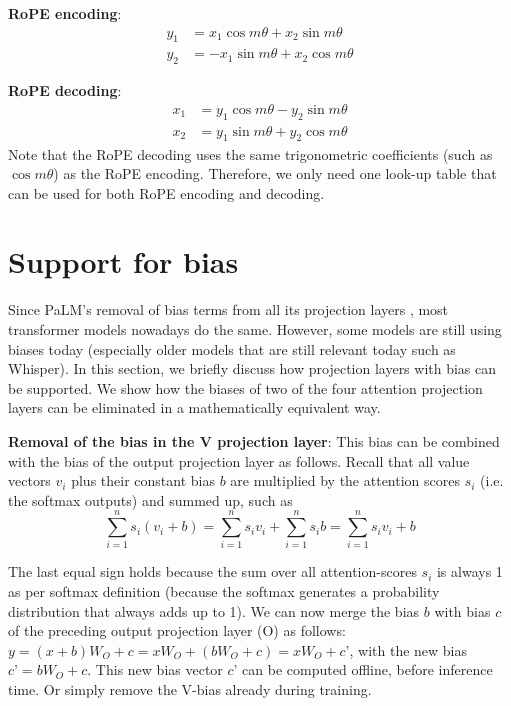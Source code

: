 \documentclass{article}
\numberwithin{equation}{section} %
\begin{document}
\textbf{RoPE encoding}:
\begin{align*}
  y_1 &=  x_1 \cos{m \theta} + x_2 \sin{m \theta} \\
  y_2 &= -x_1 \sin{m \theta} + x_2 \cos{m \theta}
\end{align*}

\textbf{RoPE decoding}:
\begin{align*}
  x_1 &= y_1 \cos{m \theta} - y_2 \sin{m \theta} \\
  x_2 &= y_1 \sin{m \theta} + y_2 \cos{m \theta}
\end{align*}
Note that the RoPE decoding uses the same trigonometric coefficients (such as $\cos{m \theta}$) as the RoPE encoding. Therefore, we only need one look-up table that can be used for both RoPE encoding and decoding.

\section{Support for bias}
Since PaLM’s removal of bias terms from all its projection layers \citep{PaLM}, most transformer models nowadays do the same. However, some models are still using biases today (especially older models that are still relevant today such as Whisper). In this section, we briefly discuss how projection layers with bias can be supported. We show how the biases of two of the four attention projection layers can be eliminated in a mathematically equivalent way.

\textbf{Removal of the bias in the V projection layer}: This bias can be combined with the bias of the output projection layer as follows. Recall that all value vectors $v_i$ plus their constant bias $b$ are multiplied by the attention scores $s_i$ (i.e. the softmax outputs) and summed up, such as
\begin{equation*}
  \sum_{i=1}^n s_i (v_i + b) = \sum_{i=1}^n s_i v_i + \sum_{i=1}^n s_i b = \sum_{i=1}^n s_i v_i + b
\end{equation*}

The last equal sign holds because the sum over all attention-scores $s_i$ is always 1 as per softmax definition (because the softmax generates a probability distribution that always adds up to 1). We can now merge the bias $b$ with bias $c$ of the preceding output projection layer (O) as follows: $y = (x + b) W_O + c = x W_O + (b W_O + c) = x W_O + c’$, with the new bias $c’ = b W_O + c$. This new bias vector $c’$ can be computed offline, before inference time. Or simply remove the V-bias already during training.
\end{document}

